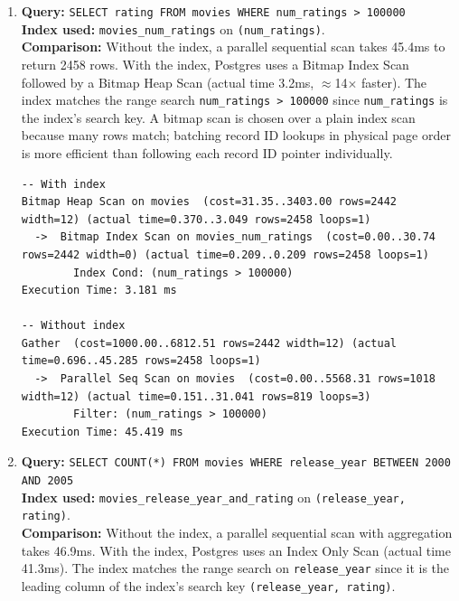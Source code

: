 \documentclass[12pt,letterpaper, onecolumn]{exam}
\begin{document}
\begin{questions}
\begin{parts}
\begin{enumerate}
\begin{solution}
\begin{enumerate}
\begin{lstlisting}[language={}, basicstyle=\tiny\ttfamily]
-- Without index
Gather  (cost=1000.00..6568.41 rows=1 width=4) (actual time=7.152..30.749 rows=1 loops=1)
  ->  Parallel Seq Scan on movies  (cost=0.00..5568.31 rows=1 width=4) (actual time=9.701..14.768 rows=0 loops=3)
        Filter: ((title)::text = 'The Matrix'::text)
Execution Time: 30.776 ms
        \end{lstlisting}

        \item \textbf{Query:} \lstinline|SELECT rating FROM movies WHERE num_ratings > 100000|\\
        \textbf{Index used:} \texttt{movies\_num\_ratings} on \texttt{(num\_ratings)}.\\
        \textbf{Comparison:} Without the index, a parallel sequential scan takes 45.4ms to return 2458 rows. With the index, Postgres uses a Bitmap Index Scan followed by a Bitmap Heap Scan (actual time 3.2ms, $\approx$14$\times$ faster). The index matches the range search \texttt{num\_ratings > 100000} since \texttt{num\_ratings} is the index's search key. A bitmap scan is chosen over a plain index scan because many rows match; batching record ID lookups in physical page order is more efficient than following each record ID pointer individually.

        \begin{lstlisting}[language={}, basicstyle=\tiny\ttfamily]
-- With index
Bitmap Heap Scan on movies  (cost=31.35..3403.00 rows=2442 width=12) (actual time=0.370..3.049 rows=2458 loops=1)
  ->  Bitmap Index Scan on movies_num_ratings  (cost=0.00..30.74 rows=2442 width=0) (actual time=0.209..0.209 rows=2458 loops=1)
        Index Cond: (num_ratings > 100000)
Execution Time: 3.181 ms

-- Without index
Gather  (cost=1000.00..6812.51 rows=2442 width=12) (actual time=0.696..45.285 rows=2458 loops=1)
  ->  Parallel Seq Scan on movies  (cost=0.00..5568.31 rows=1018 width=12) (actual time=0.151..31.041 rows=819 loops=3)
        Filter: (num_ratings > 100000)
Execution Time: 45.419 ms
        \end{lstlisting}

        \item \textbf{Query:} \lstinline|SELECT COUNT(*) FROM movies WHERE release_year BETWEEN 2000 AND 2005|\\
        \textbf{Index used:} \texttt{movies\_release\_year\_and\_rating} on \texttt{(release\_year, rating)}.\\
        \textbf{Comparison:} Without the index, a parallel sequential scan with aggregation takes 46.9ms. With the index, Postgres uses an Index Only Scan (actual time 41.3ms). The index matches the range search on \texttt{release\_year} since it is the leading column of the index's search key \texttt{(release\_year, rating)}.


\end{enumerate}
\end{solution}
\end{enumerate}
\end{parts}
\end{questions}
\end{document}
